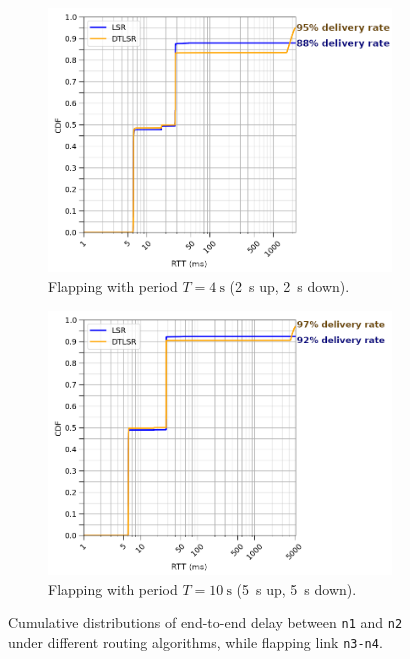 \documentclass[withindex,glossary,openany]{cam-thesis}
\begin{document}
\begin{figure}
\centering
\begin{subfigure}{0.8\textwidth}
  \centering
  \includegraphics[width=1\linewidth]{delay_box_flap2}
  \caption{Flapping with period $T=\SI{4}{\s}$ (\SI{2}{\s} up, \SI{2}{\s} down).}
  \label{fig:box_20}
\end{subfigure}
\centering
\begin{subfigure}{0.8\textwidth}
  \centering
  \includegraphics[width=1\linewidth]{delay_box_flap5}
  \caption{Flapping with period $T=\SI{10}{\s}$ (\SI{5}{\s} up, \SI{5}{\s} down).}
  \label{fig:box_5}
\end{subfigure}
\caption{Cumulative distributions of end-to-end delay between \texttt{n1} and \texttt{n2} under different routing algorithms, while flapping link \texttt{n3-n4}.}
\label{fig:box}
\end{figure}
\end{document}
